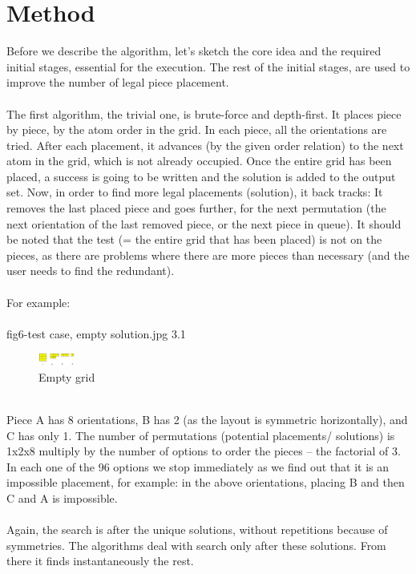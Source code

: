 \documentclass[a4paper,twoside,10pt]{report}
\begin{document}
\chapter{Method}\label{Method}

Before we describe the algorithm, let’s sketch the core idea and the required initial stages, essential for the execution. The rest of the initial stages, are used to improve the number of legal piece placement.
\\\\
The first algorithm, the trivial one, is brute-force and depth-first. It places piece by piece, by the atom order in the grid. In each piece, all the orientations are tried. After each placement, it advances (by the given order relation) to the next atom in the grid, which is not already occupied. Once the entire grid has been placed, a success is going to be written and the solution is added to the output set. Now, in order to find more legal placements (solution), it back tracks: It removes the last placed piece and goes further, for the next permutation (the next orientation of the last removed piece, or the next piece in queue). It should be noted that the test (= the entire grid that has been placed) is not on the pieces, as there are problems where there are more pieces than necessary (and the user needs to find the redundant).
\\
\\
For example:
\\
\\
fig6-test case, empty solution.jpg 3.1
\\
\begin{figure}[p]
	\includegraphics[width=12mm]{fig6-test_case,_empty_solution.jpg}
	\caption{Empty grid}
	\label{fig:Empty grid}
\end{figure}
\\
Piece A has 8 orientations, B has 2 (as the layout is symmetric horizontally), and C has only 1. The number of permutations (potential placements/ solutions) is 1x2x8 multiply by the number of options to order the pieces – the factorial of 3. In each one of the 96 options we stop immediately as we find out that it is an impossible placement, for example: in the above orientations, placing B and then C and A is impossible.
\\
\\
Again, the search is after the unique solutions, without repetitions because of symmetries. The algorithms deal with search only after these solutions. From there it finds instantaneously the rest.
\end{document}
